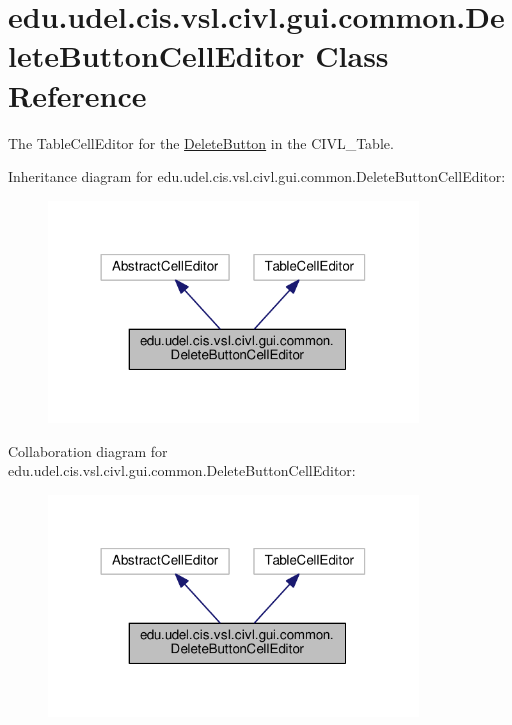 \hypertarget{classedu_1_1udel_1_1cis_1_1vsl_1_1civl_1_1gui_1_1common_1_1DeleteButtonCellEditor}{}\section{edu.\+udel.\+cis.\+vsl.\+civl.\+gui.\+common.\+Delete\+Button\+Cell\+Editor Class Reference}
\label{classedu_1_1udel_1_1cis_1_1vsl_1_1civl_1_1gui_1_1common_1_1DeleteButtonCellEditor}


The Table\+Cell\+Editor for the \hyperlink{classedu_1_1udel_1_1cis_1_1vsl_1_1civl_1_1gui_1_1common_1_1DeleteButton}{Delete\+Button} in the C\+I\+V\+L\+\_\+\+Table.  




Inheritance diagram for edu.\+udel.\+cis.\+vsl.\+civl.\+gui.\+common.\+Delete\+Button\+Cell\+Editor\+:
\nopagebreak
\begin{figure}[H]
\begin{center}
\leavevmode
\includegraphics[width=278pt]{classedu_1_1udel_1_1cis_1_1vsl_1_1civl_1_1gui_1_1common_1_1DeleteButtonCellEditor__inherit__graph}
\end{center}
\end{figure}


Collaboration diagram for edu.\+udel.\+cis.\+vsl.\+civl.\+gui.\+common.\+Delete\+Button\+Cell\+Editor\+:
\nopagebreak
\begin{figure}[H]
\begin{center}
\leavevmode
\includegraphics[width=278pt]{classedu_1_1udel_1_1cis_1_1vsl_1_1civl_1_1gui_1_1common_1_1DeleteButtonCellEditor__coll__graph}
\end{center}
\end{figure}
